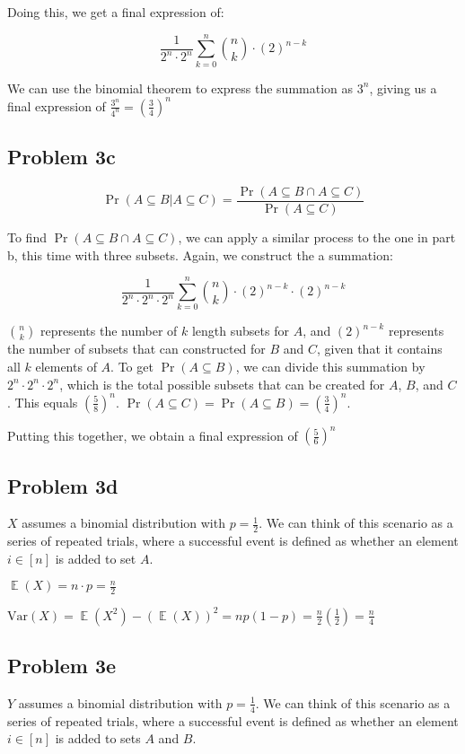 \documentclass{article}
\newcommand{\Var}{\mathrm{Var}}
\DeclareMathOperator{\EX}{\mathbb{E}}
\begin{document}
\noindent Doing this, we get a final expression of:

$$\frac{1}{2^n \cdot 2^n}\sum_{k = 0}^{n} \binom{n}{k} \cdot (2)^{n - k}$$

\noindent We can use the binomial theorem to express the summation as $3^n$, giving us a final expression of $\frac{3^n}{4^n} = \boxed{\left(\frac{3}{4} \right)^n}$

\subsection{Problem 3c}

$$\Pr(A \subseteq B | A \subseteq C) = \frac{\Pr(A \subseteq B \cap A \subseteq C)}{\Pr(A \subseteq C)}$$

\noindent To find $\Pr(A \subseteq B \cap A \subseteq C)$, we can apply a similar process to the one in part b, this time with three subsets. Again, we construct the a summation:

$$\frac{1}{2^n \cdot 2^n \cdot 2^n}\sum_{k = 0}^{n} \binom{n}{k} \cdot (2)^{n - k} \cdot (2)^{n - k}$$

\noindent $\binom{n}{k}$ represents the number of $k$ length subsets for $A$, and $(2)^{n - k}$ represents the number of subsets that can constructed for $B$ and $C$, given that it contains all $k$ elements of $A$. To get $\Pr(A  \subseteq B)$, we can divide this summation by $2^n \cdot 2^n \cdot 2^n$, which is the total possible subsets that can be created for $A$, $B$, and $C$. This equals $\left(\frac{5}{8} \right)^n$. \noindent $\Pr(A \subseteq C) = \Pr(A \subseteq B) = \left(\frac{3}{4} \right)^n$.

\noindent Putting this together, we obtain a final expression of $\boxed{\left(\frac{5}{6} \right)^n}$

\subsection{Problem 3d}

$X$ assumes a binomial distribution with $p = \frac{1}{2}$. We can think of this scenario as a series of repeated trials, where a successful event is defined as whether an element $i \in [n]$ is added to set $A$.

\noindent $\EX(X) = n \cdot p = \boxed{\frac{n}{2}}$

\noindent $\Var(X) = \EX(X^2) - (\EX(X))^2 = np(1 - p) = \frac{n}{2}\left(\frac{1}{2}\right) = \boxed{\frac{n}{4}}$

\subsection{Problem 3e}

$Y$ assumes a binomial distribution with $p = \frac{1}{4}$. We can think of this scenario as a series of repeated trials, where a successful event is defined as whether an element $i \in [n]$ is added to sets $A$ and $B$.
\end{document}
